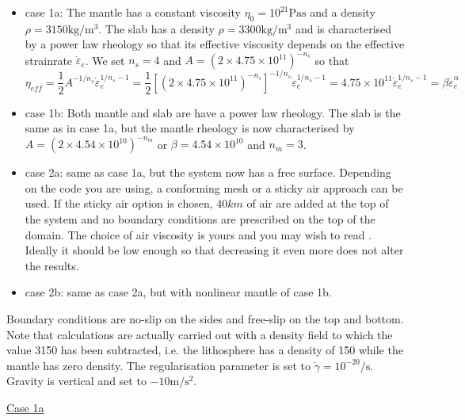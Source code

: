 \begin{itemize}
\item case 1a: 
The mantle has a constant viscosity $\eta_0=10^{21}\si{\pascal\second}$ and a density 
$\rho=3150\si{\kilogram\per\cubic\metre}$. 
The slab has a density $\rho=3300\si{\kilogram\per\cubic\metre}$ 
and is characterised by a power law rheology so that 
its effective viscosity depends on the effective strainrate $\dot\varepsilon_e$.
We set $n_s=4$ and $A=(2 \times 4.75\!\times\! 10^{11})^{-n_s}$ so that 
\begin{equation}
\eta_{eff}
=\frac{1}{2} A^{-1/n_s} \dot\varepsilon_e^{1/n_s-1} 
=\frac{1}{2} [(2 \times 4.75\!\times\! 10^{11})^{-n_s}]^{-1/n_s} \dot\varepsilon_e^{1/n_s-1} 
=4.75\!\times\! 10^{11} \dot\varepsilon_e^{1/n_s-1} 
= \beta \dot\varepsilon_e^\alpha
\end{equation}

\item case 1b: 
Both mantle and slab are have a power law rheology. 
The slab is the same as in case 1a, but the mantle rheology is now 
characterised by $A=(2 \times 4.54 \!\times\! 10^{10})^{-n_m}$ or $\beta=4.54 \times 10^{10}$ 
and $n_m=3$.

\item case 2a: same as case 1a, but the system now has a free surface. Depending on the code 
you are using, a conforming mesh or a sticky air approach can be used. If the sticky air option is chosen,
$40km$ of air are added at the top of the system and no boundary conditions are prescribed on 
the top of the domain. The choice of air viscosity is yours and you may wish to read \cite{crsg12}.
Ideally it should be low enough so that decreasing it even more does not alter the results. 

\item case 2b: same as case 2a, but with nonlinear mantle of case 1b. 

\end{itemize}

Boundary conditions are no-slip on the sides and free-slip on the top and bottom. 
Note that calculations are actually carried out with a density field to which the value 3150 has 
been subtracted, i.e. the lithosphere has a density of 150 while the mantle has zero density.
The regularisation parameter is set to $\dot{\gamma}=10^{-20}\si{\per\second}$.
Gravity is vertical and set to $-10\si{\metre\per\square\second}$.

\newpage
\underline{Case 1a}

